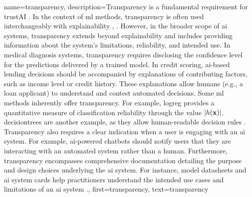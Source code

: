 
{name={transparency},
	description={Transparency is a fundamental requirement for 
		\gls{trustAI} \cite{HLEGTrustworhtyAI}. In the context of \gls{ml} 
		methods, transparency is often used interchangeably with \gls{explainability} 
		\cite{JunXML2020}, \cite{gallese2023ai}. However, in the broader scope of \gls{ai} 
		systems, transparency extends beyond \gls{explainability} and includes providing information 
		about the system’s limitations, reliability, and intended use. 
		In medical diagnosis systems, transparency requires disclosing the confidence level 
		for the \gls{prediction}s delivered by a trained \gls{model}. In credit scoring, 
		\gls{ai}-based lending decisions should be accompanied by explanations of 
		contributing factors, such as income level or credit history. These explanations 
		allow humans (e.g., a loan applicant) to understand and contest automated decisions. 
		Some \gls{ml} methods inherently offer transparency. For example, \gls{logreg} 
		provides a quantitative measure of \gls{classification} reliability through the value $|h({\bf x})|$. 
		\Gls{decisiontree}s are another example, as they allow human-readable decision rules \cite{rudin2019stop}.
		Transparency also requires a clear indication when a user is engaging with an \gls{ai} system. 
		For example, \gls{ai}-powered chatbots should notify users that they are interacting with an 
		automated system rather than a human. Furthermore, transparency encompasses comprehensive 
		documentation detailing the purpose and design choices underlying the \gls{ai} system. 
		For instance, \gls{model} datasheets \cite{DatasheetData2021} and \gls{ai} system cards \cite{10.1145/3287560.3287596} 
		help practitioners understand the intended use cases and limitations of an \gls{ai} system \cite{Shahriari2017}.},
	first={transparency}, text={transparency} 
}



